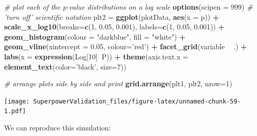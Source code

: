 \documentclass[]{book}
\newenvironment{Shaded}{\begin{snugshade}}{\end{snugshade}}
\newcommand{\CommentTok}[1]{\textcolor[rgb]{0.56,0.35,0.01}{\textit{#1}}}
\newcommand{\DataTypeTok}[1]{\textcolor[rgb]{0.13,0.29,0.53}{#1}}
\newcommand{\DecValTok}[1]{\textcolor[rgb]{0.00,0.00,0.81}{#1}}
\newcommand{\FloatTok}[1]{\textcolor[rgb]{0.00,0.00,0.81}{#1}}
\newcommand{\KeywordTok}[1]{\textcolor[rgb]{0.13,0.29,0.53}{\textbf{#1}}}
\newcommand{\NormalTok}[1]{#1}
\newcommand{\OperatorTok}[1]{\textcolor[rgb]{0.81,0.36,0.00}{\textbf{#1}}}
\newcommand{\StringTok}[1]{\textcolor[rgb]{0.31,0.60,0.02}{#1}}
\begin{document}
\begin{Shaded}
\begin{Highlighting}[]
\CommentTok{# plot each of the p-value distributions on a log scale}
\KeywordTok{options}\NormalTok{(}\DataTypeTok{scipen =} \DecValTok{999}\NormalTok{) }\CommentTok{# 'turn off' scientific notation}
\NormalTok{plt2 =}\StringTok{ }\KeywordTok{ggplot}\NormalTok{(plotData, }\KeywordTok{aes}\NormalTok{(}\DataTypeTok{x =}\NormalTok{ p)) }\OperatorTok{+}
\StringTok{    }\KeywordTok{scale_x_log10}\NormalTok{(}\DataTypeTok{breaks=}\KeywordTok{c}\NormalTok{(}\DecValTok{1}\NormalTok{, }\FloatTok{0.05}\NormalTok{, }\FloatTok{0.001}\NormalTok{), }
                  \DataTypeTok{labels=}\KeywordTok{c}\NormalTok{(}\DecValTok{1}\NormalTok{, }\FloatTok{0.05}\NormalTok{, }\FloatTok{0.001}\NormalTok{)) }\OperatorTok{+}
\StringTok{    }\KeywordTok{geom_histogram}\NormalTok{(}\DataTypeTok{colour =} \StringTok{"darkblue"}\NormalTok{, }\DataTypeTok{fill =} \StringTok{"white"}\NormalTok{) }\OperatorTok{+}
\StringTok{    }\KeywordTok{geom_vline}\NormalTok{(}\DataTypeTok{xintercept =} \FloatTok{0.05}\NormalTok{, }\DataTypeTok{colour=}\StringTok{'red'}\NormalTok{) }\OperatorTok{+}
\StringTok{    }\KeywordTok{facet_grid}\NormalTok{(variable }\OperatorTok{~}\StringTok{ }\NormalTok{.) }\OperatorTok{+}
\StringTok{    }\KeywordTok{labs}\NormalTok{(}\DataTypeTok{x =} \KeywordTok{expression}\NormalTok{(Log[}\DecValTok{10}\NormalTok{]}\OperatorTok{~}\NormalTok{P)) }\OperatorTok{+}
\StringTok{    }\KeywordTok{theme}\NormalTok{(}\DataTypeTok{axis.text.x =} \KeywordTok{element_text}\NormalTok{(}\DataTypeTok{color=}\StringTok{'black'}\NormalTok{, }\DataTypeTok{size=}\DecValTok{7}\NormalTok{))}
 
\CommentTok{# arrange plots side by side and print}
\KeywordTok{grid.arrange}\NormalTok{(plt1, plt2, }\DataTypeTok{nrow=}\DecValTok{1}\NormalTok{)}
\end{Highlighting}
\end{Shaded}

\texttt{[image: SuperpowerValidation\_files/figure-latex/unnamed-chunk-59-1.pdf]}

We can reproduce this simulation:
\end{document}

